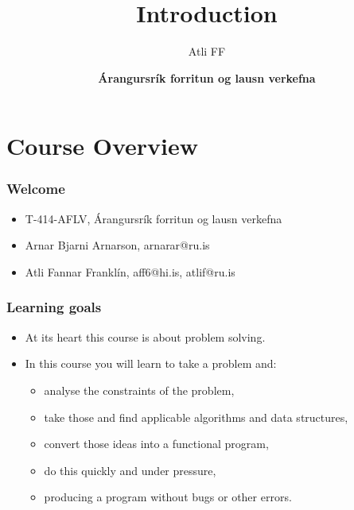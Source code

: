 \documentclass{beamer}
\title{Introduction}
\author{Atli FF}
\institute{\href{http://ru.is/td}{School of Computer Science} \\[2pt] \href{http://ru.is}{Reykjavík University}}
\date{\textbf{Árangursrík forritun og lausn verkefna}}
\begin{document}
\begin{frame}[plain]
    \titlepage
\end{frame}

\section*{Course Overview}

\begin{frame}[plain]
	\frametitle{Welcome}
	\begin{itemize}
		 \item T-414-AFLV, Árangursrík forritun og lausn verkefna
         \vspace{10pt}
         \item Arnar Bjarni Arnarson, {\alert{arnarar@ru.is}}
         \item Atli Fannar Franklín, {\alert{aff6@hi.is}, \alert{atlif@ru.is}}
	\end{itemize}
\end{frame}

\begin{frame}[plain]
	\frametitle{Learning goals}
	\begin{itemize}
		 \item At its heart this course is about problem solving.
		 \item In this course you will learn to take a problem and:
		 \begin{itemize}
		 	\item analyse the constraints of the problem,
		 	\item take those and find applicable algorithms and data structures,
		 	\item convert those ideas into a functional program,
		 	\item do this quickly and under pressure,
		 	\item producing a program without bugs or other errors.
		 \end{itemize}
	\end{itemize}
\end{frame}
\end{document}
